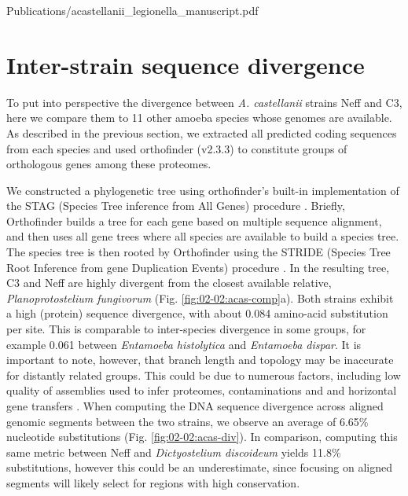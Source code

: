 
     {Publications/acastellanii_legionella_manuscript.pdf}    


\section{Inter-strain sequence divergence}

To put into perspective the divergence between \textit{A. castellanii} strains Neff and C3, here we compare them to 11 other amoeba species whose genomes are available. As described in the previous section, we extracted all predicted coding sequences from each species and used orthofinder (v2.3.3) to constitute groups of orthologous genes among these proteomes.

We constructed a phylogenetic tree using orthofinder's built-in implementation of the STAG (Species Tree inference from All Genes) procedure \cite{emmsSTAGSpeciesTree2018}. Briefly, Orthofinder builds a tree for each gene based on multiple sequence alignment, and then uses all gene trees where all species are available to build a species tree. The species tree is then rooted by Orthofinder using the STRIDE (Species Tree Root Inference from gene Duplication Events) procedure \cite{emmsSTRIDESpeciesTree2017}. In the resulting tree, C3 and Neff are highly divergent from the closest available relative, \textit{Planoprotostelium fungivorum} (Fig. \ref{fig:02-02:acas-comp}a). Both strains exhibit a high (protein) sequence divergence, with about 0.084 amino-acid substitution per site. This is comparable to inter-species divergence in some groups, for example 0.061 between \textit{Entamoeba histolytica} and \textit{Entamoeba dispar}. It is important to note, however, that branch length and topology may be inaccurate for distantly related groups. This could be due to numerous factors, including low quality of assemblies used to infer proteomes, contaminations and and horizontal gene transfers \cite{kapliPhylogeneticTreeBuilding2020}. When computing the DNA sequence divergence across aligned genomic segments between the two strains, we observe an average of 6.65\% nucleotide substitutions (Fig. \ref{fig:02-02:acas-div}). In comparison, computing this same metric between Neff and \textit{Dictyostelium discoideum} yields 11.8\% substitutions, however this could be an underestimate, since focusing on aligned segments will likely select for regions with high conservation.

